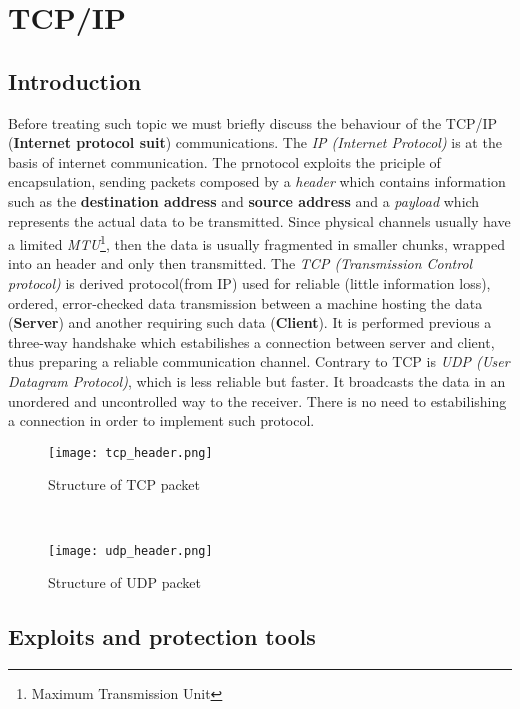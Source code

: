 \documentclass[../../main.tex]{subfiles}
\begin{document}
    

\section{TCP/IP}
\subsection{Introduction}
Before treating such topic we must briefly discuss the behaviour of the
TCP/IP (\textbf{Internet protocol suit}) communications. The \emph{IP (Internet Protocol)} is at the basis of internet
communication. The prnotocol exploits the priciple of encapsulation, sending
packets composed by a \emph{header} which contains information such as the
\textbf{destination address} and \textbf{source address} and a
\emph{payload} which represents the actual data to be transmitted.
Since physical channels usually have a limited \emph{MTU}\footnote{Maximum
Transmission Unit}, then the data is usually fragmented in smaller chunks,
wrapped into an header and only then transmitted. The \emph{TCP (Transmission Control protocol)} is derived protocol(from IP) used for
reliable (little information loss), ordered, error-checked data transmission
between a machine hosting the data (\textbf{Server}) and another requiring
such data (\textbf{Client}). It is performed previous a three-way handshake
which estabilishes a connection between server and client, thus preparing a
reliable communication channel. Contrary to TCP is \emph{UDP (User Datagram Protocol)}, which is less
reliable but faster. It broadcasts the data in an unordered and uncontrolled way to the receiver. 
There is no need to estabilishing a connection in order to implement such
protocol.

\begin{figure*}[h]
    \centering
    \begin{subfigure}{.45\textwidth}
        \centering
        \texttt{[image: tcp\_header.png]}
        \caption{Structure of TCP packet}
    \end{subfigure}%
    ~
    \begin{subfigure}{.45\textwidth}
        \centering
        \texttt{[image: udp\_header.png]}
        \caption{Structure of UDP packet}
    \end{subfigure}
\end{figure*}

\subsection{Exploits and protection tools}
\end{document}
